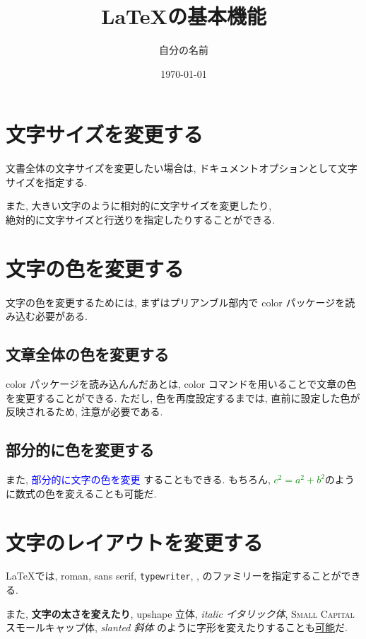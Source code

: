 \documentclass[a4j, titlepage]{jarticle}
\title{\LaTeX の基本機能}
\date{\today}
\author{自分の名前}
\begin{document}
  \maketitle %

  \tableofcontents
  \clearpage

  \section{文字サイズを変更する}
  文書全体の文字サイズを変更したい場合は, ドキュメントオプションとして文字サイズを指定する.
  
  また, {\Large 大きい文字}のように相対的に文字サイズを変更したり,\\
  絶対的に文字サイズと行送りを指定したりすることができる.

  

  \section{文字の色を変更する}
  文字の色を変更するためには, まずはプリアンブル部内で color パッケージを読み込む必要がある.

  \subsection{文章全体の色を変更する}
  \color{red}
  color パッケージを読み込んんだあとは, color コマンドを用いることで文章の色を変更することができる.
  ただし, 色を再度設定するまでは, 直前に設定した色が反映されるため, 注意が必要である.
  \color{black}

  \subsection{部分的に色を変更する}
  また, \textcolor{blue}{部分的に文字の色を変更} することもできる.
  もちろん, \textcolor{green}{$c^2 = a^2 + b^2$}のように数式の色を変えることも可能だ.

  \section{文字のレイアウトを変更する}
  \LaTeX では, \textrm{roman}, \textsf{sans serif}, \texttt{typewriter}, ,  のファミリーを指定することができる.
  
  また, \textbf{文字の太さを変えたり}, \textup{upshape 立体}, \textit{italic イタリック体}, \textsc{Small Capital スモールキャップ体}, \textsl{slanted 斜体} のように字形を変えたりすることも\underline{可能}だ.
\end{document}
